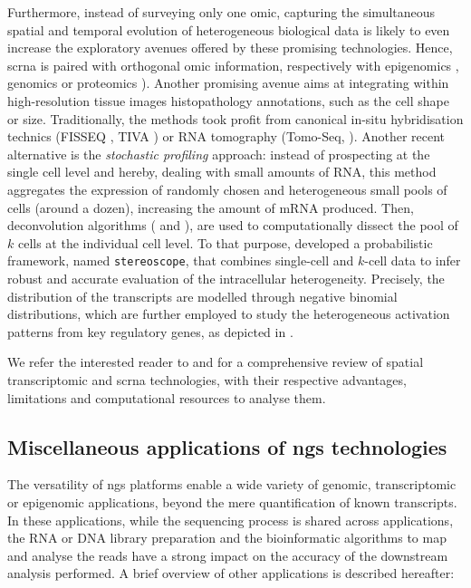 Furthermore, instead of surveying only one omic, capturing the simultaneous spatial and temporal evolution of heterogeneous biological data is likely to even increase the exploratory avenues offered by these promising technologies. Hence, \acrshort{scrna} is paired with orthogonal omic information, respectively with epigenomics \autocite{smallwood_etal14}, genomics \autocite{dey_etal15} or proteomics \autocite{amir_etal13}). Another promising avenue aims at integrating within high-resolution tissue images histopathology annotations, such as the cell shape or size. Traditionally, the methods took profit from canonical in-situ hybridisation technics (FISSEQ \autocite{lee_etal14}, TIVA \autocite{lovatt_etal14}) or RNA tomography (Tomo-Seq, \autocite{holler_junker19}).  Another recent alternative is the \emph{stochastic profiling} approach: instead of prospecting at the single cell level and hereby, dealing with small amounts of RNA, this method aggregates the expression of randomly chosen and heterogeneous small pools of cells (around a dozen), increasing the amount of mRNA produced. Then, deconvolution algorithms (\autocite{narayanan_etal16} and  \autocite{andersson_etal20}), are used to computationally dissect the pool of $k$ cells at the individual cell level. To that purpose, \autocite{andersson_etal20} developed a probabilistic framework, named \texttt{stereoscope}, that combines single-cell and $k$-cell data to infer robust and accurate evaluation of the intracellular heterogeneity. Precisely, the distribution of the transcripts are modelled through negative binomial distributions, which are further employed to study the heterogeneous activation patterns from key regulatory genes, as depicted in . 


We refer the interested reader to \autocite{longo_etal21} and \autocite{williams_etal22} for a comprehensive review of spatial transcriptomic and \acrshort{scrna} technologies, with their respective advantages, limitations and computational resources to analyse them.



\subsection{Miscellaneous applications of ngs technologies}
\label{subsec:miscelleanous-innovative-rna-seq}

The versatility of \acrshort{ngs} platforms enable a wide variety of genomic, transcriptomic or epigenomic applications, beyond the mere quantification of known transcripts. In these applications, while the sequencing process is shared across applications, the RNA or DNA library preparation and the bioinformatic algorithms to map and analyse the reads have a strong impact on the accuracy of the downstream analysis performed. 
A brief overview of other applications is described hereafter:

